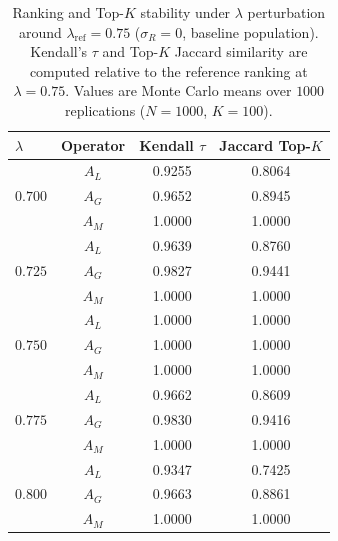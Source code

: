 \begin{table}[H]
\caption{Ranking and Top-$K$ stability under $\lambda$ perturbation around
$\lambda_{\mathrm{ref}}=0.75$ ($\sigma_R=0$, baseline population).
Kendall's $\tau$ and Top-$K$ Jaccard similarity are computed relative to
the reference ranking at $\lambda=0.75$. Values are Monte Carlo means over
$1000$ replications ($N=1000$, $K=100$).}
\label{tab:lambda-stability}
\centering
\small
\renewcommand{\arraystretch}{1.2}
\begin{tabular}{lccc}
\toprule
$\lambda$ & Operator & Kendall $\tau$ & Jaccard Top-$K$ \\
\midrule
\multirow{3}{*}{$0.700$} & $A_L$ & 0.9255 & 0.8064 \\
 & $A_G$ & 0.9652 & 0.8945 \\
 & $A_M$ & 1.0000 & 1.0000 \\
\midrule
\multirow{3}{*}{$0.725$} & $A_L$ & 0.9639 & 0.8760 \\
 & $A_G$ & 0.9827 & 0.9441 \\
 & $A_M$ & 1.0000 & 1.0000 \\
\midrule
\multirow{3}{*}{$0.750$} & $A_L$ & 1.0000 & 1.0000 \\
 & $A_G$ & 1.0000 & 1.0000 \\
 & $A_M$ & 1.0000 & 1.0000 \\
\midrule
\multirow{3}{*}{$0.775$} & $A_L$ & 0.9662 & 0.8609 \\
 & $A_G$ & 0.9830 & 0.9416 \\
 & $A_M$ & 1.0000 & 1.0000 \\
\midrule
\multirow{3}{*}{$0.800$} & $A_L$ & 0.9347 & 0.7425 \\
 & $A_G$ & 0.9663 & 0.8861 \\
 & $A_M$ & 1.0000 & 1.0000 \\
\bottomrule
\end{tabular}
\end{table}

